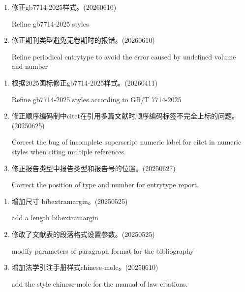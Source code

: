 


\label{up:20260610}

\begin{enumerate}

\item 修正gb7714-2025样式。(20260610)

Refine gb7714-2025 styles 

\item 修正期刊类型避免无卷期时的报错。(20260610)

Refine periodical entrytype to avoid the error caused by undefined volume and number 

\end{enumerate}


\label{up:20260411}

\begin{enumerate}

\item 根据2025国标修正gb7714-2025样式。(20260411)

Refine gb7714-2025 styles according to GB/T 7714-2025

\item 修正顺序编码制中citet在引用多篇文献时顺序编码标签不完全上标的问题。(20250625)

Correct the bug of incomplete superscript numeric label for citet in numeric styles when citing multiple references.

\item 修正报告类型中报告类型和报告号的位置。(20250627)

Correct the position of type and number for entrytype report.

\end{enumerate}





\label{up:20250610}
\begin{enumerate}

\item 增加尺寸 bibextramargin。(20250525)

add a length bibextramargin

\item 修改了文献表的段落格式设置参数。(20250525)

modify parameters of paragraph format for the bibliography

\item 增加法学引注手册样式chinese-molc。(20250610)

add the style chinese-molc for the manual of law citations.

\end{enumerate}

